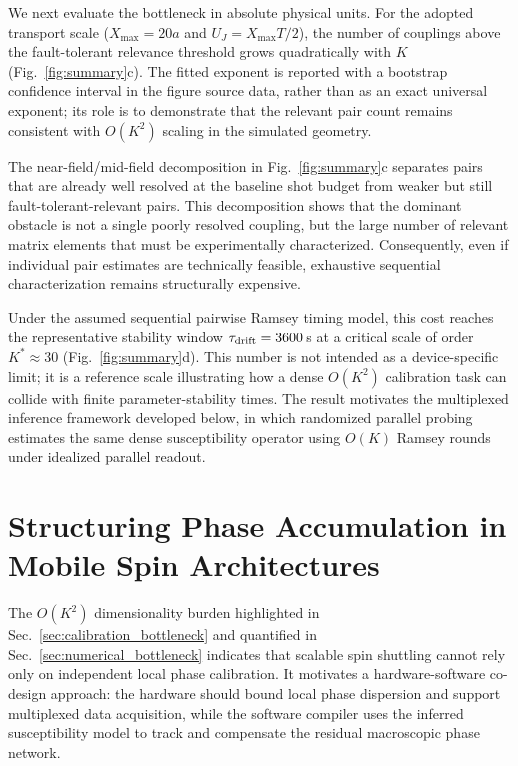 \documentclass[a4paper,twocolumn,11pt]{quantumarticle}
\begin{document}
We next evaluate the bottleneck in absolute physical units. For the adopted transport scale ($X_{\max}=20a$ and $U_J=X_{\max}T/2$), the number of couplings above the fault-tolerant relevance threshold grows quadratically with $K$ (Fig.~\ref{fig:summary}c). The fitted exponent is reported with a bootstrap confidence interval in the figure source data, rather than as an exact universal exponent; its role is to demonstrate that the relevant pair count remains consistent with $O(K^2)$ scaling in the simulated geometry.

The near-field/mid-field decomposition in Fig.~\ref{fig:summary}c separates pairs that are already well resolved at the baseline shot budget from weaker but still fault-tolerant-relevant pairs. This decomposition shows that the dominant obstacle is not a single poorly resolved coupling, but the large number of relevant matrix elements that must be experimentally characterized. Consequently, even if individual pair estimates are technically feasible, exhaustive sequential characterization remains structurally expensive.

Under the assumed sequential pairwise Ramsey timing model, this cost reaches the representative stability window $\tau_{\rm drift}=3600$\,s at a critical scale of order $K^*\approx30$ (Fig.~\ref{fig:summary}d). This number is not intended as a device-specific limit; it is a reference scale illustrating how a dense $O(K^2)$ calibration task can collide with finite parameter-stability times. The result motivates the multiplexed inference framework developed below, in which randomized parallel probing estimates the same dense susceptibility operator using $O(K)$ Ramsey rounds under idealized parallel readout.

\section{Structuring Phase Accumulation in Mobile Spin Architectures}
\label{sec:structured_phase}

The $O(K^2)$ dimensionality burden highlighted in Sec.~\ref{sec:calibration_bottleneck} and quantified in Sec.~\ref{sec:numerical_bottleneck} indicates that scalable spin shuttling cannot rely only on independent local phase calibration. It motivates a hardware-software co-design approach: the hardware should bound local phase dispersion and support multiplexed data acquisition, while the software compiler uses the inferred susceptibility model to track and compensate the residual macroscopic phase network.
\end{document}
